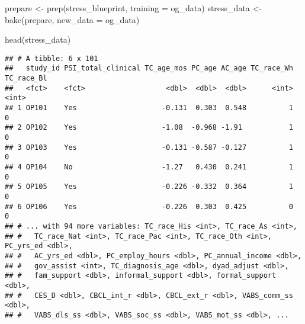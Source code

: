 \documentclass[
]{article}
\newenvironment{Shaded}{\begin{snugshade}}{\end{snugshade}}
\newcommand{\AttributeTok}[1]{\textcolor[rgb]{0.77,0.63,0.00}{#1}}
\newcommand{\CommentTok}[1]{\textcolor[rgb]{0.56,0.35,0.01}{\textit{#1}}}
\newcommand{\DecValTok}[1]{\textcolor[rgb]{0.00,0.00,0.81}{#1}}
\newcommand{\FunctionTok}[1]{\textcolor[rgb]{0.00,0.00,0.00}{#1}}
\newcommand{\NormalTok}[1]{#1}
\newcommand{\OtherTok}[1]{\textcolor[rgb]{0.56,0.35,0.01}{#1}}
\newcommand{\SpecialCharTok}[1]{\textcolor[rgb]{0.00,0.00,0.00}{#1}}
\begin{document}
\begin{Shaded}
\begin{Highlighting}[]
\NormalTok{prepare }\OtherTok{\textless{}{-}} \FunctionTok{prep}\NormalTok{(stress\_blueprint, }\AttributeTok{training =}\NormalTok{ og\_data)}
\NormalTok{stress\_data }\OtherTok{\textless{}{-}} \FunctionTok{bake}\NormalTok{(prepare, }\AttributeTok{new\_data =}\NormalTok{ og\_data)}

\FunctionTok{head}\NormalTok{(stress\_data)}
\end{Highlighting}
\end{Shaded}

\begin{verbatim}
## # A tibble: 6 x 101
##   study_id PSI_total_clinical TC_age_mos PC_age AC_age TC_race_Wh TC_race_Bl
##   <fct>    <fct>                   <dbl>  <dbl>  <dbl>      <int>      <int>
## 1 OP101    Yes                    -0.131  0.303  0.548          1          0
## 2 OP102    Yes                    -1.08  -0.968 -1.91           1          0
## 3 OP103    Yes                    -0.131 -0.587 -0.127          1          0
## 4 OP104    No                     -1.27   0.430  0.241          1          0
## 5 OP105    Yes                    -0.226 -0.332  0.364          1          0
## 6 OP106    Yes                    -0.226  0.303  0.425          0          0
## # ... with 94 more variables: TC_race_His <int>, TC_race_As <int>,
## #   TC_race_Nat <int>, TC_race_Pac <int>, TC_race_Oth <int>, PC_yrs_ed <dbl>,
## #   AC_yrs_ed <dbl>, PC_employ_hours <dbl>, PC_annual_income <dbl>,
## #   gov_assist <int>, TC_diagnosis_age <dbl>, dyad_adjust <dbl>,
## #   fam_support <dbl>, informal_support <dbl>, formal_support <dbl>,
## #   CES_D <dbl>, CBCL_int_r <dbl>, CBCL_ext_r <dbl>, VABS_comm_ss <dbl>,
## #   VABS_dls_ss <dbl>, VABS_soc_ss <dbl>, VABS_mot_ss <dbl>, ...
\end{verbatim}

\begin{Shaded}
\end{Shaded}
\end{document}
